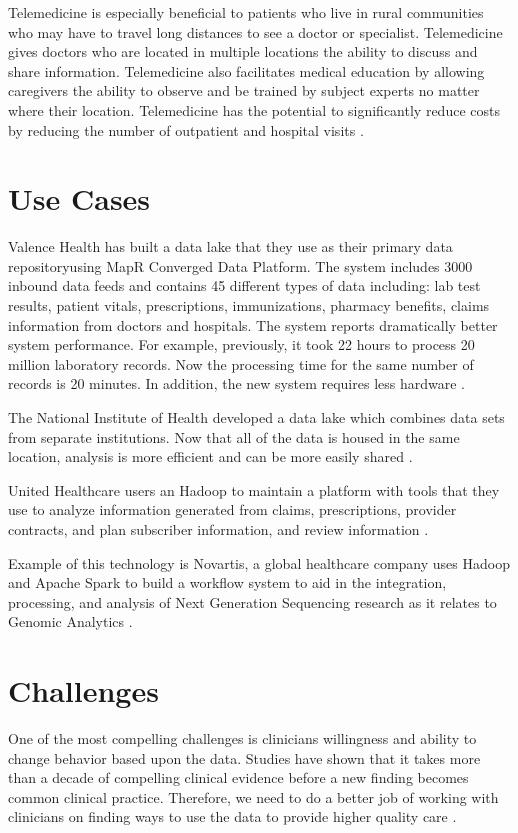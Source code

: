 \documentclass[sigconf]{acmart}
\begin{document}
{{{Telemedicine is especially beneficial to patients who live in rural communities who may have to travel long distances to see a doctor or specialist.  Telemedicine gives doctors who are located in multiple locations the ability to discuss and share information. Telemedicine also facilitates medical education by allowing caregivers the ability to observe and be trained by subject experts no matter where their location. Telemedicine has the potential to significantly reduce costs by reducing the number of outpatient and hospital visits \cite{www-google-wikitele}.

 \section{Use Cases}
Valence Health has built a data lake that they use as their primary data repositoryusing MapR Converged Data Platform. The system includes 3000 inbound data feeds and contains 45 different types of data including:  lab test results, patient vitals, prescriptions, immunizations, pharmacy benefits, claims information from doctors and hospitals. The system reports dramatically better system performance. For example, previously, it took 22 hours to process 20 million laboratory records. Now the processing time for the same number of records is 20 minutes. In addition, the new system requires less hardware \cite{www-google-McDonald}. 

The National Institute of Health developed a data lake which combines data sets from separate institutions. Now that all of the data is housed in the same location, analysis is more efficient and can be more easily shared \cite{www-google-McDonald}.

United Healthcare users an Hadoop to maintain a platform with tools that they use to analyze information generated from claims, prescriptions, provider contracts, and plan subscriber information, and review information \cite{www-google-McDonald}.

Example of this technology is Novartis, a global healthcare company uses Hadoop and Apache Spark to build a workflow system to aid in the integration, processing, and analysis of Next Generation Sequencing research as it relates to Genomic Analytics \cite{www-google-McDonald}.


\section{Challenges}
One of the most compelling challenges is clinicians willingness and ability to change behavior based upon the data.  Studies have shown that it takes more than a decade of compelling clinical evidence before a new finding becomes common clinical practice. Therefore, we need to do a better job of working with clinicians on finding ways to use the data to provide higher quality care \cite{www-google-hadoop}. 

}}}
\end{document}
